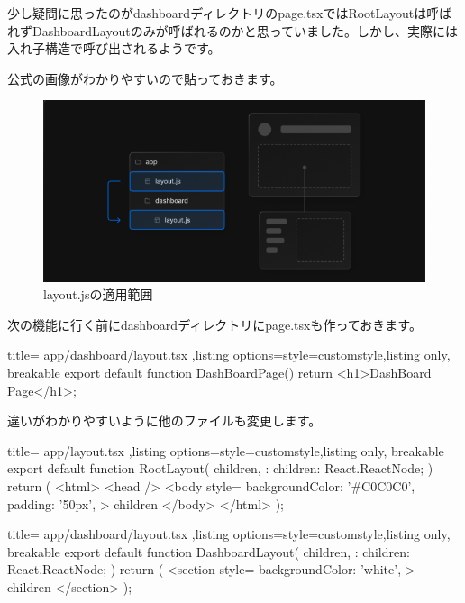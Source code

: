 少し疑問に思ったのがdashboardディレクトリのpage.tsxではRootLayoutは呼ばれずDashboardLayoutのみが呼ばれるのかと思っていました。しかし、実際には入れ子構造で呼び出されるようです。

公式の画像がわかりやすいので貼っておきます。
\begin{figure}[H]
  \centering
  \includegraphics[width=12cm]{./image/03-Tech/chap4/02.png}
  \caption{layout.jsの適用範囲}
\end{figure}

次の機能に行く前にdashboardディレクトリにpage.tsxも作っておきます。
\begin{tcblisting}{title={
        app/dashboard/layout.tsx
      },listing options={style=customstyle},listing only, breakable}
  export default function DashBoardPage() {
      return <h1>DashBoard Page</h1>;
  }

\end{tcblisting}


違いがわかりやすいように他のファイルも変更します。
\begin{tcblisting}{title={
        app/layout.tsx
      },listing options={style=customstyle},listing only, breakable}
      export default function RootLayout({
        children,
      }: {
        children: React.ReactNode;
      }) {
        return (
          <html>
            <head />
            <body
              style={{
                backgroundColor: '#C0C0C0',
                padding: '50px',
              }}
            >
              {children}
            </body>
          </html>
        );
      }
      

\end{tcblisting}




\begin{tcblisting}{title={
        app/dashboard/layout.tsx
      },listing options={style=customstyle},listing only, breakable}
      export default function DashboardLayout({
        children,
      }: {
        children: React.ReactNode;
      }) {
        return (
          <section
            style={{
              backgroundColor: 'white',            
            }}
          >
            {children}
          </section>
        );
      }
\end{tcblisting}



